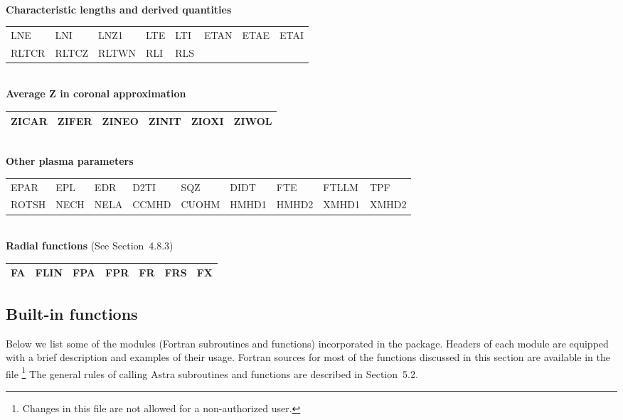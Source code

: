 \bigskip
\\
\noindent
{\bf Characteristic lengths and derived quantities}\\[1ex]
{\tt\begin{tabular}
{|p{13mm}p{13mm}p{13mm}p{13mm}p{13mm}p{13mm}p{13mm}p{13mm}|}	\hline
LNE	& LNI	& LNZ1	& LTE	& LTI	& ETAN	& ETAE	& ETAI	\\
RLTCR	& RLTCZ	& RLTWN	& RLI	& RLS	&	&	&	\\ \hline
\end{tabular}}
\bigskip
\\
\noindent
{\bf Average Z in coronal approximation}\\[1ex]
{\tt\begin{tabular}
{|p{13mm}p{13mm}p{13mm}p{13mm}p{13mm}p{13mm}|}			\hline
ZICAR	& ZIFER	& ZINEO	& ZINIT	& ZIOXI	& ZIWOL \\		\hline
\end{tabular}}
\bigskip
\\
\noindent
{\bf Other plasma parameters}\\[1ex]
{\tt\begin{tabular}
{|p{13mm}p{13mm}p{13mm}	p{13mm}	p{13mm}	p{13mm}	p{13mm}	p{13mm} p{13mm}|}
\hline
EPAR	& EPL	& EDR	& D2TI	& SQZ	& DIDT	& FTE	& FTLLM	& TPF \\
ROTSH	& NECH  & NELA  & CCMHD	& CUOHM	& HMHD1	& HMHD2	& XMHD1	& XMHD2\\
\hline
\end{tabular}} 
\bigskip
\\
{\bf Radial functions} (See Section~4.8.3)\\[1ex]
{\tt\begin{tabular}
{|p{13mm}p{13mm}p{13mm}p{13mm}p{13mm}p{13mm}p{13mm}|}		\hline
FA	& FLIN	& FPA	& FPR	& FR	& FRS	&  FX	\\	\hline
\end{tabular}}

\subsection{Built-in functions}

Below we list some of the modules (Fortran subroutines and functions)
incorporated in the package. Headers of each module are equipped with
a brief description and examples of their usage. 
Fortran sources for most of the functions discussed in this section are
available in the file \footnote
{Changes in this file are not allowed for a non-authorized user.}
The general rules of calling Astra subroutines and functions are
described in Section~5.2.

